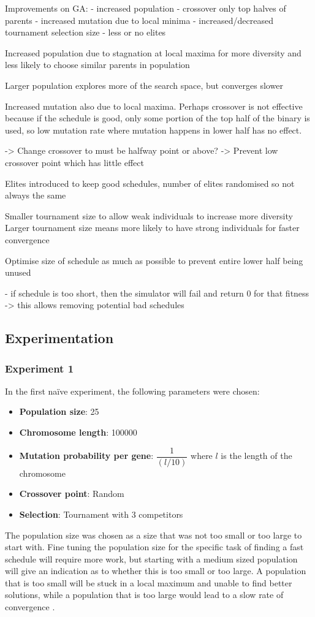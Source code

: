 \documentclass{article}
\begin{document}
Improvements on GA:
- increased population
- crossover only top halves of parents
- increased mutation due to local minima
- increased/decreased tournament selection size
- less or no elites

Increased population due to stagnation at local maxima for more diversity and less likely to choose similar parents in population

Larger population explores more of the search space, but converges slower

Increased mutation also due to local maxima. Perhaps crossover is not effective because if the schedule is good, only some portion of the top half of the binary is used, so low mutation rate where mutation happens in lower half has no effect.

-> Change crossover to must be halfway point or above? -> Prevent low crossover point which has little effect

Elites introduced to keep good schedules, number of elites randomised so not always the same 

Smaller tournament size to allow weak individuals to increase more diversity
Larger tournament size means more likely to have strong individuals for faster convergence

Optimise size of schedule as much as possible to prevent entire lower half being unused


- if schedule is too short, then the simulator will fail and return 0 for that fitness -> this allows removing potential bad schedules

\subsection{Experimentation}
\subsubsection{Experiment 1}
In the first na\"{i}ve experiment, the following parameters were chosen:
\begin{itemize}
\item \textbf{Population size}: 25
\item \textbf{Chromosome length}: 100000
\item \textbf{Mutation probability per gene}: $\dfrac{1}{(l/10)}$ where $l$ is the length of the chromosome
\item \textbf{Crossover point}: Random
\item \textbf{Selection}: Tournament with 3 competitors
\end{itemize}
The population size was chosen as a size that was not too small or too large to start with. Fine tuning the population size for the specific task of finding a fast schedule will require more work, but starting with a medium sized population will give an indication as to whether this is too small or too large. A population that is too small will be stuck in a local maximum and unable to find better solutions, while a population that is too large would lead to a slow rate of convergence \cite{ga-size}. 
\end{document}
